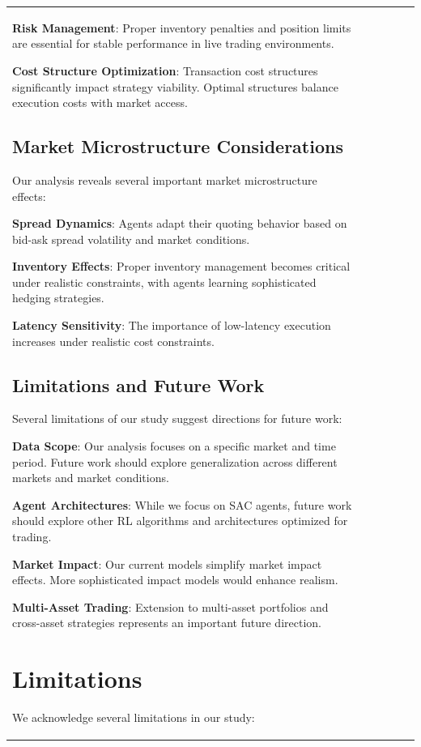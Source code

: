\documentclass[11pt,a4paper]{article}
\begin{document}
\begin{table}[h]
\begin{tabular}{|l|c|c|c|c|c|}
\textbf{Risk Management}: Proper inventory penalties and position limits are essential for stable performance in live trading environments.

\textbf{Cost Structure Optimization}: Transaction cost structures significantly impact strategy viability. Optimal structures balance execution costs with market access.

\subsection{Market Microstructure Considerations}

Our analysis reveals several important market microstructure effects:

\textbf{Spread Dynamics}: Agents adapt their quoting behavior based on bid-ask spread volatility and market conditions.

\textbf{Inventory Effects}: Proper inventory management becomes critical under realistic constraints, with agents learning sophisticated hedging strategies.

\textbf{Latency Sensitivity}: The importance of low-latency execution increases under realistic cost constraints.

\subsection{Limitations and Future Work}

Several limitations of our study suggest directions for future work:

\textbf{Data Scope}: Our analysis focuses on a specific market and time period. Future work should explore generalization across different markets and market conditions.

\textbf{Agent Architectures}: While we focus on SAC agents, future work should explore other RL algorithms and architectures optimized for trading.

\textbf{Market Impact}: Our current models simplify market impact effects. More sophisticated impact models would enhance realism.

\textbf{Multi-Asset Trading}: Extension to multi-asset portfolios and cross-asset strategies represents an important future direction.
\n\n
\section{Limitations}
\label{sec:limitations}

We acknowledge several limitations in our study:


\end{tabular}
\end{table}
\end{document}
